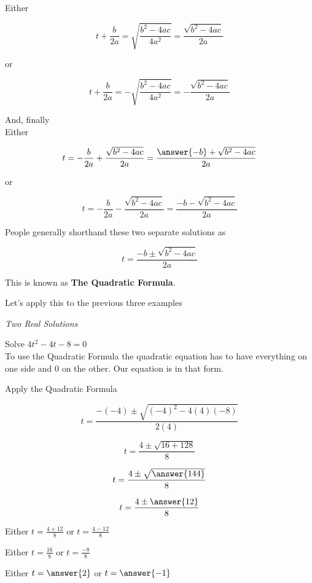 \documentclass{ximera}
\begin{document}
Either 


\[ t + \frac{b}{2 a}  = \sqrt{\frac{b^2 - 4 a c}{4 a^2}}  = \frac{\sqrt{b^2 - 4 a c}}{2a}   \]

or


\[ t + \frac{b}{2 a}  = -\sqrt{\frac{b^2 - 4 a c}{4 a^2}} = -\frac{\sqrt{b^2 - 4 a c}}{2a}    \]










And, finally \\



Either 


\[ t   = - \frac{b}{2 a} + \frac{\sqrt{b^2 - 4 a c}}{2a}  = \frac{\answer{-b} + \sqrt{b^2 - 4 a c}}{2a}      \]

or


\[ t  = - \frac{b}{2 a}  -\frac{\sqrt{b^2 - 4 a c}}{2a} =    \frac{-b - \sqrt{b^2 - 4 a c}}{2a}      \]




People generally shorthand these two separate solutions as



\[ t  =   \frac{-b \pm \sqrt{b^2 - 4 a c}}{2a}      \]


This is known as \textbf{The Quadratic Formula}.


Let's apply this to the previous three examples







\begin{example} \textit{Two Real Solutions} 

Solve $4 t^2 - 4 t - 8 = 0$ \\

To use the Quadratic Formula the quadratic equation has to have everything on one side and $0$ on the other.  Our equation is in that form.

Apply the Quadratic Formula


\[   t = \frac{-(-4) \pm \sqrt{(-4)^2 - 4 (4) (-8)}}{2 (4)}            \]

\[   t = \frac{4 \pm \sqrt{16 + 128}}{8}            \]

\[   t = \frac{4 \pm \sqrt{\answer{144}}}{8}            \]

\[   t = \frac{4 \pm \answer{12}}{8}            \]




Either $t = \frac{4 + 12}{8} $ or $t = \frac{4 - 12}{8} $

Either $t = \frac{16}{8} $ or $t = \frac{-8}{8} $

Either $t = \answer{2}$ or $t = \answer{-1}$



\end{example}
\end{document}
